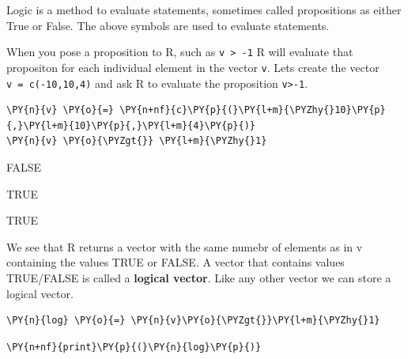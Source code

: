 Logic is a method to evaluate statements, sometimes called propositions
as either True or False. The above symbols are used to evaluate
statements.

When you pose a proposition to R, such as \texttt{v\ \textgreater{}\ -1}
R will evaluate that propositon for each individual element in the
vector \texttt{v}. Lets create the vector \texttt{v\ =\ c(-10,10,4)} and
ask R to evaluate the proposition \texttt{v\textgreater{}-1}.

    \begin{tcolorbox}[breakable, size=fbox, boxrule=1pt, pad at break*=1mm,colback=cellbackground, colframe=cellborder]
\begin{Verbatim}[commandchars=\\\{\}]
\PY{n}{v} \PY{o}{=} \PY{n+nf}{c}\PY{p}{(}\PY{l+m}{\PYZhy{}10}\PY{p}{,}\PY{l+m}{10}\PY{p}{,}\PY{l+m}{4}\PY{p}{)}
\PY{n}{v} \PY{o}{\PYZgt{}} \PY{l+m}{\PYZhy{}1}
\end{Verbatim}
\end{tcolorbox}

    \begin{enumerate*}
\item FALSE
\item TRUE
\item TRUE
\end{enumerate*}


    
    We see that R returns a vector with the same numebr of elements as in v
containing the values TRUE or FALSE. A vector that contains values
TRUE/FALSE is called a \textbf{logical vector}. Like any other vector we
can store a logical vector.

    \begin{tcolorbox}[breakable, size=fbox, boxrule=1pt, pad at break*=1mm,colback=cellbackground, colframe=cellborder]
\begin{Verbatim}[commandchars=\\\{\}]
\PY{n}{log} \PY{o}{=} \PY{n}{v}\PY{o}{\PYZgt{}}\PY{l+m}{\PYZhy{}1}
\end{Verbatim}
\end{tcolorbox}

    \begin{tcolorbox}[breakable, size=fbox, boxrule=1pt, pad at break*=1mm,colback=cellbackground, colframe=cellborder]
\begin{Verbatim}[commandchars=\\\{\}]
\PY{n+nf}{print}\PY{p}{(}\PY{n}{log}\PY{p}{)}
\end{Verbatim}
\end{tcolorbox}


